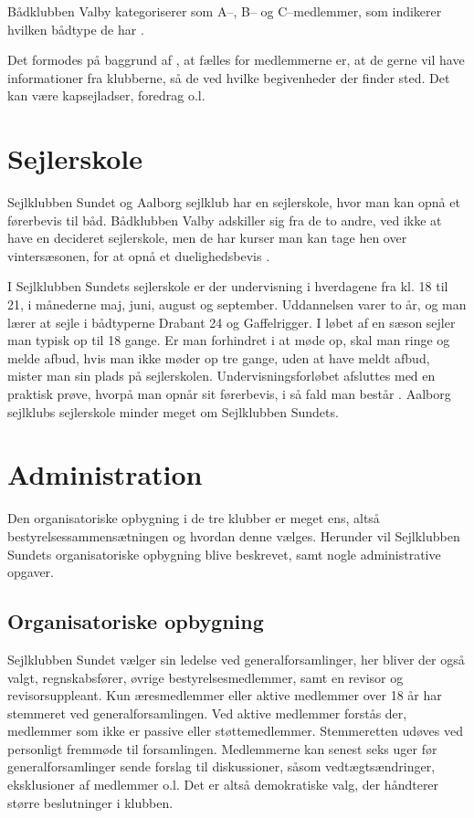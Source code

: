 Bådklubben Valby kategoriserer som A--, B-- og C--medlemmer, som indikerer hvilken bådtype de har
\citep{badklubben_valby_love}.

Det formodes på baggrund af , at fælles for medlemmerne er, at de gerne vil have
informationer fra klubberne, så de ved hvilke begivenheder der
finder sted. Det kan være kapsejladser, foredrag o.l.


\section{Sejlerskole}\label{sec:sejlerskole}

Sejlklubben Sundet og Aalborg sejlklub har en sejlerskole, hvor man kan opnå et førerbevis til båd. Bådklubben
Valby adskiller sig fra de to andre, ved ikke at have en decideret sejlerskole, men de har kurser man kan
tage hen over vintersæsonen, for at opnå et duelighedsbevis \citep{baedklubben_valby_duelighedsbevis}.

I Sejlklubben Sundets sejlerskole er der undervisning i hverdagene fra kl. 18 til 21, i månederne
maj, juni, august og september. Uddannelsen varer to år, og man lærer at sejle i bådtyperne Drabant 24 og
Gaffelrigger. I løbet af en sæson sejler man typisk op til 18 gange. Er man forhindret i at møde op, skal man
ringe og melde afbud, hvis man ikke møder op tre gange, uden at have meldt afbud, mister man sin plads på
sejlerskolen. Undervisningsforløbet afsluttes med en praktisk prøve, hvorpå man opnår sit førerbevis, i så
fald man består \citep{Sundet}. Aalborg sejlklubs sejlerskole minder meget om Sejlklubben Sundets.


\section{Administration}\label{sec:organisatoriske-opbygning}

Den organisatoriske opbygning i de tre klubber er meget ens, altså bestyrelsessammensætningen og hvordan denne
vælges. Herunder vil Sejlklubben Sundets organisatoriske opbygning blive beskrevet, samt nogle administrative
opgaver.


\subsection{Organisatoriske opbygning}\label{subsec:organisatoriske-opbygning}

Sejlklubben Sundet vælger sin ledelse ved generalforsamlinger, her bliver der også valgt, regnskabsfører,
øvrige bestyrelsesmedlemmer, samt en revisor og revisorsuppleant. Kun æresmedlemmer eller aktive medlemmer
over 18 år har stemmeret ved generalforsamlingen. Ved aktive medlemmer forstås der, medlemmer som ikke er
passive eller støttemedlemmer. Stemmeretten udøves ved personligt fremmøde til forsamlingen. Medlemmerne kan
senest seks uger før generalforsamlinger sende forslag til diskussioner, såsom vedtægtsændringer, eksklusioner
af medlemmer o.l. Det er altså demokratiske valg, der håndterer større beslutninger i klubben.


